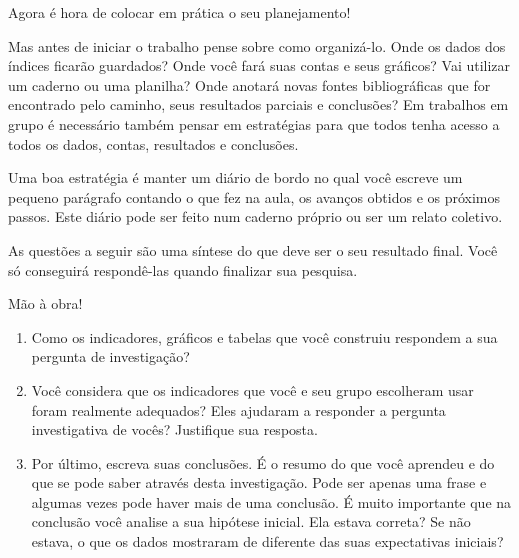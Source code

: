 \label{etapa4}

Agora é hora de colocar em prática o seu planejamento!

Mas antes de iniciar o trabalho pense sobre como organizá-lo. Onde os dados dos índices ficarão guardados? Onde você fará suas contas e seus gráficos? Vai utilizar um caderno ou uma planilha? Onde anotará novas fontes bibliográficas que for encontrado pelo caminho, seus resultados parciais e conclusões? Em trabalhos em grupo é necessário também pensar em estratégias para que todos tenha acesso a todos os dados, contas, resultados e conclusões. 

Uma boa estratégia é manter um diário de bordo no qual você escreve um pequeno parágrafo contando o que fez na aula, os avanços obtidos e os próximos passos. Este diário pode ser feito num caderno próprio ou ser um relato coletivo. 

As questões a seguir são uma síntese do que deve ser o seu resultado final. Você só conseguirá respondê-las quando finalizar sua pesquisa.

Mão à obra!

\begin{enumerate}
\item Como os indicadores, gráficos e tabelas que você construiu respondem a sua pergunta de investigação?
\item Você considera que os indicadores que você e seu grupo escolheram usar foram realmente adequados? Eles ajudaram a responder a pergunta investigativa de vocês? Justifique sua resposta.
\item Por último, escreva suas conclusões. É o resumo do que você aprendeu e do que se pode saber através desta investigação. Pode ser apenas uma frase e algumas vezes pode haver mais de uma conclusão. É muito importante que na conclusão você analise a sua hipótese inicial. Ela estava correta? Se não estava, o que os dados mostraram de diferente das suas expectativas iniciais?
\end{enumerate}

